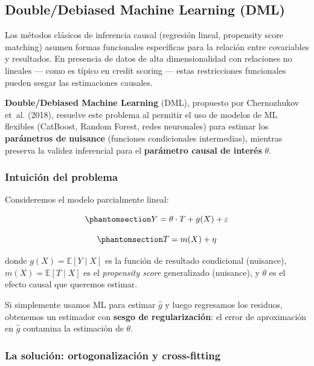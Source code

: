 \documentclass[
  spanish,
  11pt,
  letterpaper,
]{scrbook}
\theoremstyle{plain}
\theoremstyle{remark}
\begin{document}
\subsection{Double/Debiased Machine Learning (DML)}\label{sec-dml}

Los métodos clásicos de inferencia causal (regresión lineal, propensity
score matching) asumen formas funcionales específicas para la relación
entre covariables y resultados. En presencia de datos de alta
dimensionalidad con relaciones no lineales --- como es típico en credit
scoring --- estas restricciones funcionales pueden sesgar las
estimaciones causales.

\textbf{Double/Debiased Machine Learning} (DML), propuesto por
{Chernozhukov et~al.} (2018), resuelve este problema al permitir el uso
de modelos de ML flexibles (CatBoost, Random Forest, redes neuronales)
para estimar los \textbf{parámetros de nuisance} (funciones
condicionales intermedias), mientras preserva la validez inferencial
para el \textbf{parámetro causal de interés} \(\theta\).

\subsubsection{Intuición del problema}\label{intuiciuxf3n-del-problema}

Consideremos el modelo parcialmente lineal:

\begin{equation}\protect\phantomsection\label{eq-partial-linear}{
Y = \theta \cdot T + g(X) + \varepsilon
}\end{equation}

\begin{equation}\protect\phantomsection\label{eq-treatment-model}{
T = m(X) + \eta
}\end{equation}

donde \(g(X) = \mathbb{E}[Y \mid X]\) es la función de resultado
condicional (nuisance), \(m(X) = \mathbb{E}[T \mid X]\) es el
\emph{propensity score} generalizado (nuisance), y \(\theta\) es el
efecto causal que queremos estimar.

Si simplemente usamos ML para estimar \(\hat{g}\) y luego regresamos los
residuos, obtenemos un estimador con \textbf{sesgo de regularización}:
el error de aproximación en \(\hat{g}\) contamina la estimación de
\(\theta\).

\subsubsection{La solución: ortogonalización y
cross-fitting}\label{la-soluciuxf3n-ortogonalizaciuxf3n-y-cross-fitting}
\end{document}
